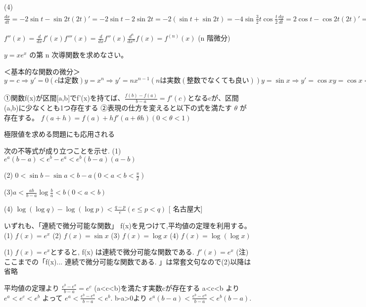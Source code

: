 (4)
$
\frac{dx}{dt}
=-2\sin t-\sin{2t}(2t)'
=-2\sin t-2\sin{2t}
=-2(\sin t+\sin{2t})
=-4\sin{\frac{3}{2}t}\cos{\frac{t}{2}}
\frac{dy}{dt}
=2\cos t-\cos{2t}(2t)'
=2\cos t-2\cos{2t}
=-2(\cos{2t}-\cos t)
=4\sin{\frac{3}{2}t}\sin{\frac{t}{2}}
\frac{dy}{dx} = \frac{\frac{dy}{dt}}{\frac{dx}{dt}}
=\frac{4\sin{\frac{3}{2}t}\sin{\frac{t}{2}}}{-4\sin{\frac{3}{2}t}\cos{\frac{t}{2}}}
=-\frac{\sin{\frac{t}{2}}}{\cos{\frac{t}{2}}} = -\tan{\frac{t}{2}}
\frac{d^2y}{dx^2} = \frac{d}{dt}(\frac{dy}{dx})\cdot\frac{dt}{dx}
=\frac{d}{dt}(-\tan{\frac{t}{2}})\cdot\frac{dt}{dx}
=-\frac{(\frac{t}{2})'}{\cos^2{\frac{t}{2}}}\cdot\frac{1}{-4\sin{\frac{3}{2}t}\cos{\frac{t}{2}}}
=\frac{1}{8\cos^3{\frac{t}{2}}\sin{\frac{3}{2}t}}
$

$
f''(x)=\frac{d}{dx}f'(x)
f'''(x)=\frac{d}{dx}f''(x)
\frac{d^n}{dx^n} f(x)=f^(n)(x)
$
(n 階微分)

$
y=xe^x
$ の第 n 次導関数を求めなさい。

＜基本的な関数の微分＞
$
y=c \Rightarrow y'=0    (c は定数)
y=x^n \Rightarrow y'=nx^{n-1}   (n は実数(整数でなくても良い))
y=\sin x \Rightarrow y' = \cos x
y=\cos x \Rightarrow y' = -\sin x
y=\tan x \Rightarrow y' = \frac{1}{\cos^2 x}
y=\log{|x|} \Rightarrow y' = \frac{1}{x}
y=\log[a]{|x|} \Rightarrow y' = \frac{1}{x\log{a}}
y=e^x \Rightarrow y' = e^x
y=a^x \Rightarrow y' = a^x\log{a}   (a>0, a\neq 1)
$

①関数f(x)が区間[a,b]でf'(x)を持てば、$
\frac{f(b)-f(a)}{b-a}=f'(c)
$となるcが、区間(a,b)に少なくとも1つ存在する
②表現の仕方を変えると以下の式を満たす $\theta$ が存在する。
$
f(a+h)=f(a)+hf'(a+\theta h)  (0<\theta<1)
$

極限値を求める問題にも応用される

次の不等式が成り立つことを示せ.
(1) $
e^a(b-a) <  e^b-e^a < e^b(b-a)   (a-b)
$

(2) $
0<\sin b - \sin a < b-a  (0<a<b<\frac{\pi}{2})
$

(3)$
a<\frac{ab}{b-a}\log{\frac{b}{a}}<b (0<a<b)
$

(4) $
\log{(\log{q})}- \log{(\log{p})} < \frac{q-p}{e} (e\leq p<q)
$ [ 名古屋大]


いずれも、「連続で微分可能な関数」 f(x)を見つけて,平均値の定理を利用する。
(1) $ f(x)=e^x $
(2) $ f(x)=\sin x $
(3) $ f(x)=\log x $
(4) $ f(x)=\log(\log x) $

(1) $ f(x)=e^x $とすると, f(x) は連続で微分可能な関数である.  $f'(x)=e^x$
(注)ここまでの「f(x)... 連続で微分可能な関数である.  」は常套文句なので(2)以降は省略

平均値の定理より $\frac{e^b-e^a}{b-a}=e^c$  (a<c<b)を満たす実数cが存在する
a<c<b より $e^a<e^c<e^b$
よって $e^a<\frac{e^b-e^a}{b-a}<e^b$.   b-a>0より $e^a(b-a)<\frac{e^b-e^a}{b-a}<e^b(b-a)$.   

